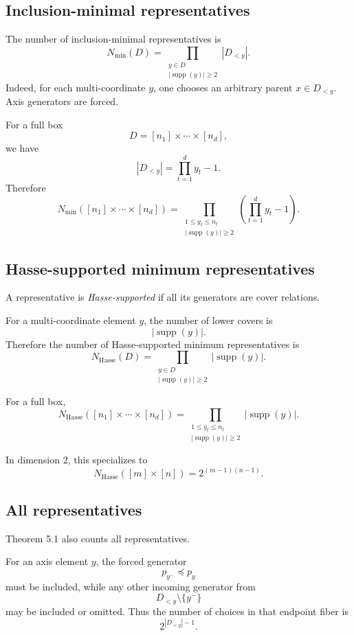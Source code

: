 \documentclass[11pt]{article}
\begin{document}
\subsection{Inclusion-minimal representatives}

The number of inclusion-minimal representatives is
\[
N_{\min}(D)
=
\prod_{\substack{y\in D\\ |\operatorname{supp}(y)|\ge2}}
|D_{<y}|.
\]
Indeed, for each multi-coordinate $y$, one chooses an arbitrary parent $x\in D_{<y}$. Axis generators are forced.

For a full box
\[
D=[n_1]\times\cdots\times[n_d],
\]
we have
\[
|D_{<y}|=\prod_{t=1}^{d} y_t-1.
\]
Therefore
\[
N_{\min}([n_1]\times\cdots\times[n_d])
=
\prod_{\substack{1\le y_t\le n_t\\ |\operatorname{supp}(y)|\ge2}}
\left(\prod_{t=1}^{d} y_t-1\right).
\]

\subsection{Hasse-supported minimum representatives}

A representative is \emph{Hasse-supported} if all its generators are cover relations.

For a multi-coordinate element $y$, the number of lower covers is
\[
|\operatorname{supp}(y)|.
\]
Therefore the number of Hasse-supported minimum representatives is
\[
N_{\mathrm{Hasse}}(D)
=
\prod_{\substack{y\in D\\ |\operatorname{supp}(y)|\ge2}}
|\operatorname{supp}(y)|.
\]

For a full box,
\[
N_{\mathrm{Hasse}}([n_1]\times\cdots\times[n_d])
=
\prod_{\substack{1\le y_t\le n_t\\ |\operatorname{supp}(y)|\ge2}}
|\operatorname{supp}(y)|.
\]

In dimension $2$, this specializes to
\[
N_{\mathrm{Hasse}}([m]\times[n])
=
2^{(m-1)(n-1)}.
\]

\subsection{All representatives}

Theorem 5.1 also counts all representatives.

For an axis element $y$, the forced generator
\[
p_{y^-}\preceq p_y
\]
must be included, while any other incoming generator from
\[
D_{<y}\setminus\{y^-\}
\]
may be included or omitted. Thus the number of choices in that endpoint fiber is
\[
2^{|D_{<y}|-1}.
\]
\end{document}
